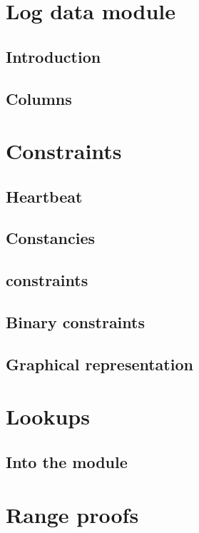 \section{Log data module}                            \label{log data: generalities}
\subsection{Introduction}                            \label{log data: generalities: intro}                 
\subsection{Columns}                                 \label{log data: generalities: columns}               

\section{Constraints}                                \label{log data: constraints}
\subsection{Heartbeat}                               \label{log data: constraints: heartbeat}              
\subsection{Constancies}                             \label{log data: constraints: constancies}            
\subsection{\logLogsData{} constraints}              \label{log data: constraints: log logs data}          
\subsection{Binary constraints}                      \label{log data: constraints: binary}                 
\subsection{Graphical representation}                \label{log data: constraints: graphical rep data}     

\section{Lookups}                                    \label{log data: lookups}
\subsection{Into the \rlpTxnRcptMod{} module}        \label{log data: lookups: into txn rlp}               

\section{Range proofs}                               \label{log data: range proofs}                        
